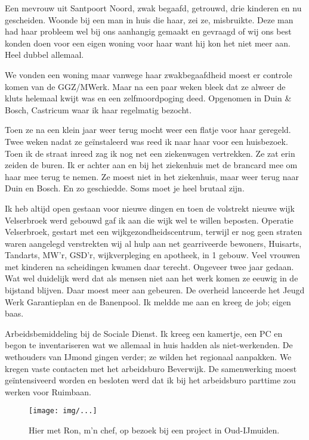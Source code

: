 \documentclass[10pt,twoside,openright]{memoir}
\begin{document}
Een mevrouw uit Santpoort Noord, zwak begaafd, getrouwd, drie kinderen en nu gescheiden. Woonde bij een man in huis die haar, zei ze, misbruikte. Deze man had haar probleem wel bij ons aanhangig gemaakt en gevraagd of wij ons best konden doen voor een eigen woning voor haar want hij kon het niet meer aan. Heel dubbel allemaal. 

We vonden een woning maar vanwege haar zwakbegaafdheid moest er controle komen van de GGZ/MWerk. Maar na een paar weken bleek dat ze alweer de kluts helemaal kwijt was en een zelfmoordpoging deed. Opgenomen in Duin \& Bosch, Castricum waar ik haar regelmatig bezocht. 

Toen ze na een klein jaar weer terug mocht weer een flatje voor haar geregeld. Twee weken nadat ze geïnstaleerd was reed ik naar haar voor een huisbezoek. Toen ik de straat inreed zag ik nog net een ziekenwagen vertrekken. Ze zat erin zeiden de buren. Ik er achter aan en bij het ziekenhuis met de brancard mee om haar mee terug te nemen. Ze moest niet in het ziekenhuis, maar weer terug naar Duin en Bosch. En zo geschiedde. Soms moet je heel brutaal zijn.

Ik heb altijd open gestaan voor nieuwe dingen en toen de volstrekt nieuwe wijk Velserbroek werd gebouwd gaf ik aan die wijk wel te willen beposten. Operatie Velserbroek, gestart met een wijkgezondheidscentrum, terwijl er nog geen straten waren aangelegd verstrekten wij al hulp aan net gearriveerde bewoners, Huisarts, Tandarts, MW’r, GSD’r, wijkverpleging en apotheek, in 1 gebouw. Veel vrouwen met kinderen na scheidingen kwamen daar terecht. Ongeveer twee jaar gedaan. Wat wel duidelijk werd dat als mensen niet aan het werk komen ze eeuwig in de bijstand blijven. Daar moest meer aan gebeuren. De overheid lanceerde het Jeugd Werk Garantieplan en de Banenpool. Ik meldde me aan en kreeg de job; eigen baas. 

Arbeidsbemiddeling bij de Sociale Dienst. Ik kreeg een kamertje, een PC en begon te inventariseren wat we allemaal in huis hadden als niet-werkenden. De wethouders van IJmond gingen verder; ze wilden het regionaal aanpakken. We kregen vaste contacten met het arbeidsburo Beverwijk. 
De samenwerking moest geïntensiveerd worden en besloten werd dat ik bij het arbeidsburo parttime zou werken voor Ruimbaan.

\begin{figure}[t]
\texttt{[image: img/...]}
\caption{Hier met Ron, m’n chef, op bezoek bij een project in Oud-IJmuiden.}
\end{figure}
\end{document}
